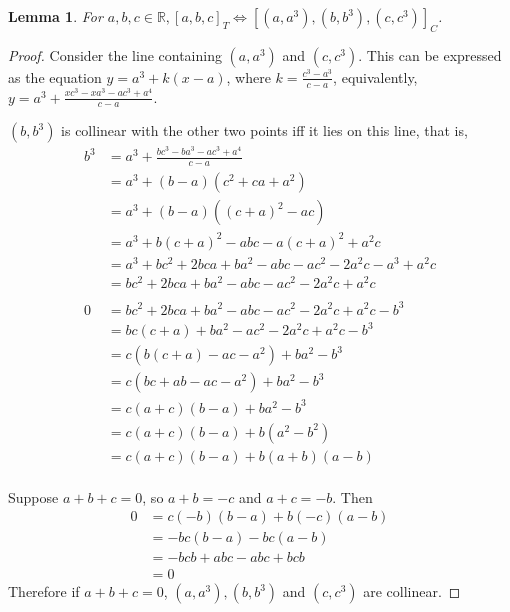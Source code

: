\documentclass[11pt]{article}
\newtheorem{lem}{Lemma}
\begin{document}
\begin{lem}
    \label{thm:col-eq-zero}
    For $a, b, c \in \mathbb{R}, [a, b, c]_T \iff [(a, a^3), (b, b^3), (c, c^3)]_{C}$.
\end{lem}

\begin{proof}
    Consider the line containing $(a, a^3)$ and $(c, c^3)$. This can be expressed as the equation $y = a^3 + k(x - a)$, where $k = \frac{c^3 - a^3}{c - a}$, equivalently, $y = a^3 + \frac{xc^3 - xa^3 - ac^3 + a^4}{c - a}$. 

    $(b, b^3)$ is collinear with the other two points iff it lies on this line, that is, \begin{align*}
        b^3 &= a^3 + \frac{bc^3 - ba^3 - ac^3 + a^4}{c - a} \\ 
        &= a^3 + (b - a)(c^2 + ca + a^2) \\ 
        &= a^3 + (b-a)((c+a)^2 - ac) \\ 
        &= a^3 + b(c+a)^2 - abc - a(c+a)^2 + a^2c \\ 
        &= a^3 + bc^2 + 2bca + ba^2 - abc - ac^2 - 2a^2c - a^3 + a^2c \\ 
        &= bc^2 + 2bca + ba^2 - abc - ac^2 - 2a^2c + a^2c \\ 
        \\
        0 &= bc^2 + 2bca + ba^2 - abc - ac^2 - 2a^2c + a^2c - b^3 \\ 
        &= bc(c + a) + ba^2 - ac^2 - 2a^2c + a^2c - b^3 \\ 
        &= c(b(c + a) - ac - a^2) + ba^2 - b^3 \\  
        &= c(bc + ab - ac - a^2) + ba^2 - b^3 \\  
        &= c(a+c)(b - a) + ba^2 - b^3 \\  
        &= c(a + c)(b - a) + b(a^2 - b^2) \\  
        &= c(a+c)(b-a) + b(a+b)(a-b) \\  
    \end{align*}

    Suppose $a+b+c = 0$, so $a+b = -c$ and $a+c = -b$.
    Then \begin{align*}
        0 &= c(-b)(b-a) + b(-c)(a-b) \\ 
        &= -bc(b-a) -bc(a-b) \\ 
        &= -bcb + abc - abc + bcb \\ 
        &= 0
    \end{align*}
    Therefore if $a+b+c = 0$, $(a, a^3), (b, b^3)$ and $(c, c^3)$ are collinear. 


\end{proof}
\end{document}
